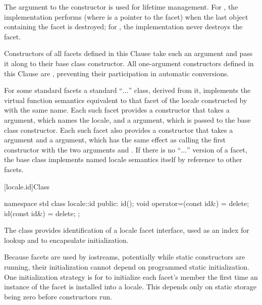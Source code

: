 \pnum
The 
argument to the constructor is used for lifetime management.
For
,
the implementation performs
(where
is a point\-er to the facet) when the last
object containing the facet is destroyed;
for
,
the implementation never destroys the facet.

\pnum
Constructors of all
facets defined in this Clause take such an argument and pass it
along to their
base class constructor.
All one-argument constructors defined
in this Clause are
,
preventing their participation in automatic conversions.

\pnum
For some standard facets a standard
``$\ldots$''
class, derived from it, implements the virtual function semantics
equivalent to that facet of the locale constructed by
with the same name.
Each such facet provides a constructor that takes a
argument, which names the locale, and a 
argument, which is passed to the base class constructor.
Each such facet also provides a constructor that takes a
 argument  and a 
argument, which has the same effect as calling the first constructor with the
two arguments  and .
If there is no
``$\ldots$''
version of a facet, the base class implements named locale
semantics itself by reference to other facets.

[locale.id]{Class }

%
\begin{codeblock}
namespace std {
  class locale::id {
  public:
    id();
    void operator=(const id&) = delete;
    id(const id&) = delete;
  };
}
\end{codeblock}

\pnum
The class  provides identification of a locale facet
interface, used as an index for lookup
and to encapsulate initialization.

\pnum
\begin{note}
Because facets are used by iostreams, potentially while static constructors are
running, their initialization cannot depend on programmed static
initialization.
One initialization strategy is for
to initialize each facet's
member the first time an instance of the facet is installed into a locale.
This depends only on static storage being zero before constructors run.
\end{note}

